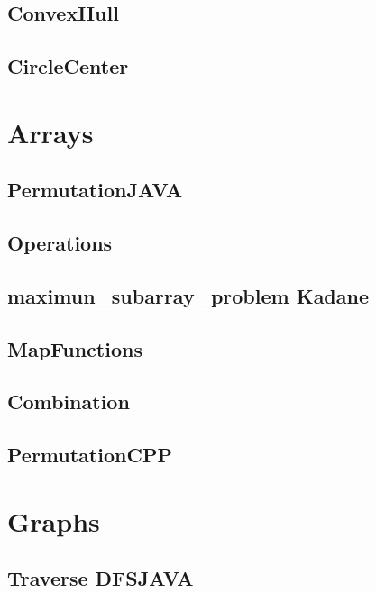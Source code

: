 \subsection{ ConvexHull}
\raggedbottom
\hrulefill
\subsection{ CircleCenter}
\raggedbottom
\hrulefill

\section{Arrays}
\subsection{ PermutationJAVA}
\raggedbottom
\hrulefill
\subsection{ Operations}
\raggedbottom
\hrulefill
\subsection{maximun_subarray_problem Kadane}
\raggedbottom
\hrulefill
\subsection{ MapFunctions}
\raggedbottom
\hrulefill
\subsection{ Combination}
\raggedbottom
\hrulefill
\subsection{ PermutationCPP}
\raggedbottom
\hrulefill

\section{Graphs}
\subsection{Traverse DFSJAVA}
\raggedbottom
\hrulefill
